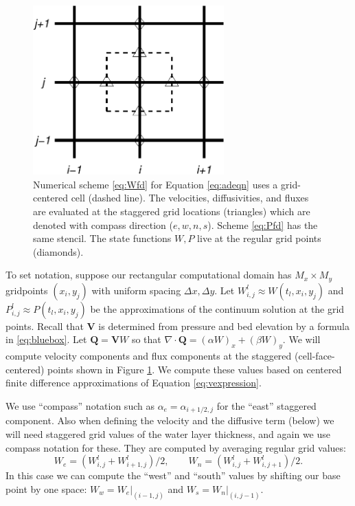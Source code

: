 \documentclass[11pt,final]{amsart}%
\newcommand\bV{\mathbf{V}}
\newcommand\bQ{\mathbf{Q}}
\newcommand{\Div}{\nabla\cdot}
\newcommand{\Wlij}{W^l_{i,j}}
\newcommand{\Plij}{P^l_{i,j}}
\begin{document}
\begin{figure}[ht]
\centering
\includegraphics[width=2.9in,keepaspectratio=true]{diffstencil}
\bigskip
\caption{Numerical scheme \eqref{eq:Wfd} for Equation \eqref{eq:adeqn} uses a grid-centered cell (dashed line).  The velocities, diffusivities, and fluxes are evaluated at the staggered grid locations (triangles) which are denoted with compass direction ($e,w,n,s$).  Scheme \eqref{eq:Pfd} has the same stencil.  The state functions $W,P$ live at the regular grid points (diamonds).}
\label{fig:stencil}
\end{figure}

To set notation, suppose our rectangular computational domain has $M_x \times M_y$ gridpoints $(x_i,y_j)$ with uniform spacing $\Delta x,\Delta y$.  Let $\Wlij \approx W(t_l,x_i,y_j)$ and $\Plij \approx P(t_l,x_i,y_j)$ be the approximations of the continuum solution at the grid points.  Recall that $\bV$ is determined from pressure and bed elevation by a formula in \eqref{eq:bluebox}.  Let $\bQ=\bV W$ so that $\Div \bQ = (\alpha W)_x + (\beta W)_y$.  We will compute velocity components and flux components at the staggered (cell-face-centered) points shown in Figure \ref{fig:stencil}.  We compute these values based on centered finite difference approximations of Equation \eqref{eq:vexpression}.

We use ``compass'' notation such as $\alpha_e = \alpha_{i+1/2,j}$ for the ``east'' staggered component.  Also when defining the velocity and the diffusive term (below) we will need staggered grid values of the water layer thickness, and again we use compass notation for these.  They are computed by averaging regular grid values:
\begin{equation}
W_e = (W_{i,j}^l + W_{i+1,j}^l)/2, \qquad W_n = (W_{i,j}^l + W_{i,j+1}^l)/2. \label{eq:stagW}
\end{equation}
In this case we can compute the ``west'' and ``south'' values by shifting our base point by one space: $W_w = W_e\big|_{(i-1,j)}$ and $W_s = W_n\big|_{(i,j-1)}$.
\end{document}
